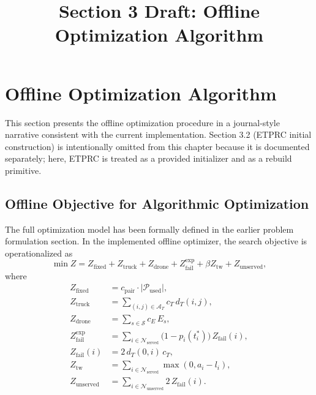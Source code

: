 \documentclass[review,12pt]{elsarticle}
\begin{document}
\begin{frontmatter}
\title{Section 3 Draft: Offline Optimization Algorithm}
\author{}
\date{}
\end{frontmatter}

\setcounter{section}{2}

\section{Offline Optimization Algorithm}
\label{sec:offline}

This section presents the offline optimization procedure in a journal-style narrative consistent with the current implementation. Section 3.2 (ETPRC initial construction) is intentionally omitted from this chapter because it is documented separately; here, ETPRC is treated as a provided initializer and as a rebuild primitive.

\subsection{Offline Objective for Algorithmic Optimization}
\label{subsec:offline_objective}

The full optimization model has been formally defined in the earlier problem formulation section. In the implemented offline optimizer, the search objective is operationalized as
\begin{equation}
\min Z =
Z_{\mathrm{fixed}} + Z_{\mathrm{truck}} + Z_{\mathrm{drone}} +
Z_{\mathrm{fail}}^{\mathrm{exp}} + \beta Z_{\mathrm{tw}} + Z_{\mathrm{unserved}},
\label{eq:offline_obj_total}
\end{equation}
where
\begin{align}
Z_{\mathrm{fixed}} &= c_{\mathrm{pair}} \cdot |\mathcal{P}_{\mathrm{used}}|, \\
Z_{\mathrm{truck}} &= \sum_{(i,j)\in \mathcal{A}_T} c_T\,d_T(i,j), \\
Z_{\mathrm{drone}} &= \sum_{s\in \mathcal{S}} c_E\,E_s, \\
Z_{\mathrm{fail}}^{\mathrm{exp}} &=
\sum_{i\in \mathcal{N}_{\mathrm{served}}}
\bigl(1-p_i(t_i^\ast)\bigr)\,Z_{\mathrm{fail}}(i), \\
Z_{\mathrm{fail}}(i) &= 2\,d_T(0,i)\,c_T, \\
Z_{\mathrm{tw}} &= \sum_{i\in \mathcal{N}_{\mathrm{served}}}\max(0,a_i-l_i), \\
Z_{\mathrm{unserved}} &= \sum_{i\in \mathcal{N}_{\mathrm{unserved}}} 2\,Z_{\mathrm{fail}}(i).
\end{align}
\end{document}
